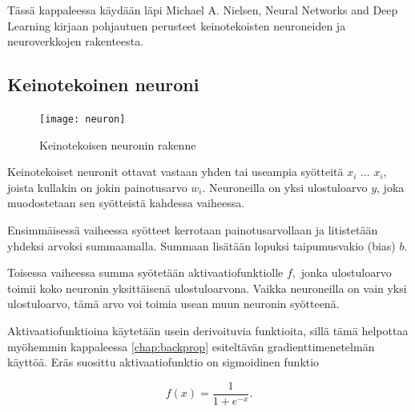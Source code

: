 \documentclass[finnish]{tktltiki2}
\theoremstyle{definition}
\theoremstyle{remark}
\begin{document}
  Tässä kappaleessa käydään läpi Michael A. Nielsen, Neural Networks and Deep Learning \cite{Nielsen-neural} kirjaan pohjautuen perusteet keinotekoisten neuroneiden ja neuroverkkojen rakenteesta. 

  \subsection{Keinotekoinen neuroni}
    \label{chap:artificial-neuron}

    \begin{figure}[h]
      \centering
      \texttt{[image: neuron]}
      \caption{Keinotekoisen neuronin rakenne}
      \label{pic:neuron}
    \end{figure}

    Keinotekoiset neuronit ottavat vastaan yhden tai useampia syötteitä $x_i$ ... $x_i$, joista kullakin on jokin painotusarvo $w_i$. Neuroneilla on yksi ulostuloarvo $y$, joka muodostetaan sen syötteistä kahdessa vaiheessa.

    Ensimmäisessä vaiheessa syötteet kerrotaan painotusarvollaan ja litistetään yhdeksi arvoksi summaamalla. Summaan lisätään lopuksi taipumusvakio (bias) $b$.

    Toisessa vaiheessa summa syötetään aktivaatiofunktiolle $f$, jonka ulostuloarvo toimii koko neuronin yksittäisenä ulostuloarvona. Vaikka neuroneilla on vain yksi ulostuloarvo, tämä arvo voi toimia usean muun neuronin syötteenä.

    Aktivaatiofunktioina käytetään usein derivoituvia funktioita, sillä tämä helpottaa myöhemmin kappaleessa \ref{chap:backprop} esiteltävän gradienttimenetelmän käyttöä. Eräs suosittu aktivaatiofunktio on sigmoidinen funktio

    \begin{equation}
      f(x) = \frac{1}{1 + e^{-x}}.
      \label{eq:sigmoid-func}
    \end{equation}
\end{document}

